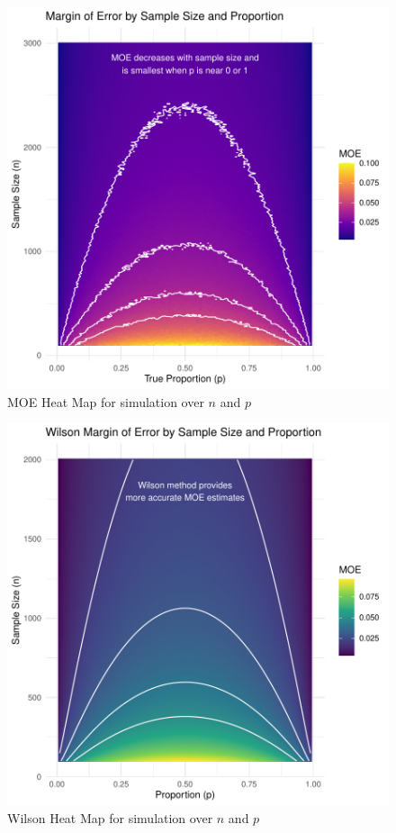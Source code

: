 \documentclass{article}\usepackage[]{graphicx}\usepackage[]{xcolor}
\begin{document}
\begin{figure}[H]
  \begin{center}
  \includegraphics[width=\textwidth]{moe.heatmap.pdf}
  \caption{MOE Heat Map for simulation over $n$ and $p$}
  \label{plot3}
  \end{center}
\end{figure}

\begin{figure}[H]
  \begin{center}
  \includegraphics[width=\textwidth]{wilson.heatmap.pdf}
  \caption{Wilson Heat Map for simulation over $n$ and $p$}
  \label{plot4}
  \end{center}
\end{figure}
\end{document}
